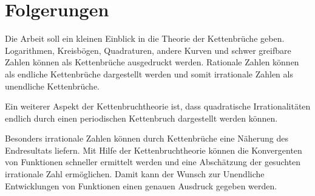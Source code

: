 %
%
%
\section{Folgerungen
\label{kettenbruch:section:folgerungen}}
Die Arbeit soll ein kleinen Einblick in die Theorie der Kettenbrüche geben.
Logarithmen, Kreisbögen, Quadraturen, andere Kurven und schwer greifbare Zahlen können als Kettenbrüche ausgedruckt werden. Rationale Zahlen können als endliche Kettenbrüche dargestellt werden und somit irrationale Zahlen als unendliche Kettenbrüche.

Ein weiterer Aspekt der Kettenbruchtheorie ist, dass quadratische Irrationalitäten endlich durch einen periodischen Kettenbruch dargestellt werden können.

Besonders irrationale Zahlen können durch Kettenbrüche eine Näherung des Endresultats liefern. Mit Hilfe der Kettenbruchtheorie können die Konvergenten von Funktionen schneller ermittelt werden und eine Abschätzung der gesuchten irrationale Zahl ermöglichen. Damit kann der Wunsch zur Unendliche Entwicklungen von Funktionen einen genauen Ausdruck gegeben werden.
